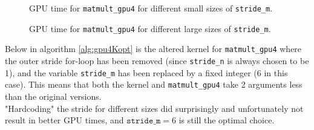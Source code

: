 \begin{figure}[H]
\centering
{}
\caption{GPU time for \texttt{matmult\_gpu4} for different small sizes of \texttt{stride\_m}.}
\label{fig:gpu4_opt}
\end{figure}

\begin{figure}[H]
\centering
{}
\caption{GPU time for \texttt{matmult\_gpu4} for different large sizes of \texttt{stride\_m}.}
\label{fig:gpu4_opt2}
\end{figure}

\noindent Below in algorithm \ref{alg:gpu4Kopt} is the altered kernel for \texttt{matmult\_gpu4} where the outer stride for-loop has been removed (since \texttt{stride\_n} is always chosen to be 1), and the variable \texttt{stride\_m} has been replaced by a fixed integer (6 in this case). This means that both the kernel and \texttt{matmult\_gpu4} take 2 arguments less than the original versions.\\

\noindent "Hardcoding" the stride for different sizes did surprisingly and unfortunately not result in better GPU times, and $\texttt{stride\_m} = 6$ is still the optimal choice.\\

